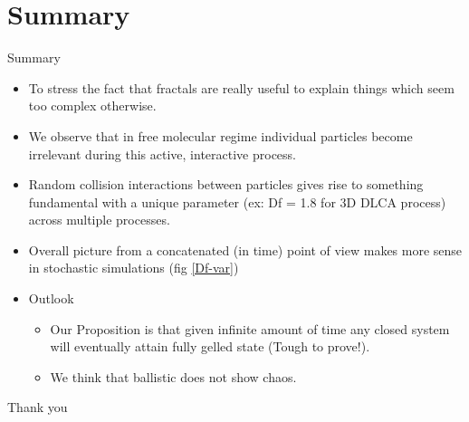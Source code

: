 \documentclass{beamer}
\begin{document}
\section{Summary}

\begin{frame}{Summary}
  \begin{itemize}
  \item To stress the fact that fractals are really useful to explain things which seem too complex otherwise.
  \item
 We observe that in free molecular regime individual particles become irrelevant during this active, interactive process.   
   \item
  Random collision interactions between particles gives rise to something \alert{fundamental with a unique parameter} (ex: Df = 1.8 for 3D DLCA process) across multiple processes.
  \item Overall picture from a concatenated (in time) point of view makes more sense in stochastic simulations (fig \ref{Df-var})
   \end{itemize}
  
  \begin{itemize}
  \item
    Outlook
    \begin{itemize}
    \item
      Our Proposition is that given infinite amount of time any closed system will eventually attain fully gelled state (Tough to prove!).
    \item
    We think that ballistic does \alert{not} show chaos.
    \end{itemize}
    
  \end{itemize}
\end{frame}


\begin{frame}

Thank you
\end{frame}



\end{document}
